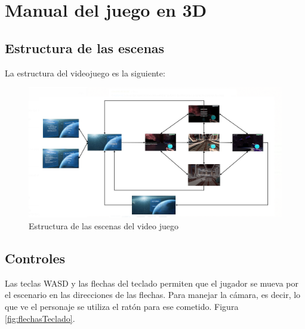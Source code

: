 \chapter{Manual del juego en 3D}

\section{Estructura de las escenas}

La estructura del videojuego es la siguiente: 

\begin{figure}[H]
	\centering
	\includegraphics[scale=0.50]{imagenes/estructuraEscena3D.png}
	\caption{\label{fig:EstructuraEscena3D}Estructura de las escenas del video juego}
\end{figure}

\section{Controles}

Las teclas WASD y las flechas del teclado permiten que el jugador se mueva por el escenario en las direcciones de las flechas. Para manejar la cámara, es decir, lo que ve el personaje se utiliza el ratón para ese cometido. Figura \ref{fig:flechasTeclado}.

